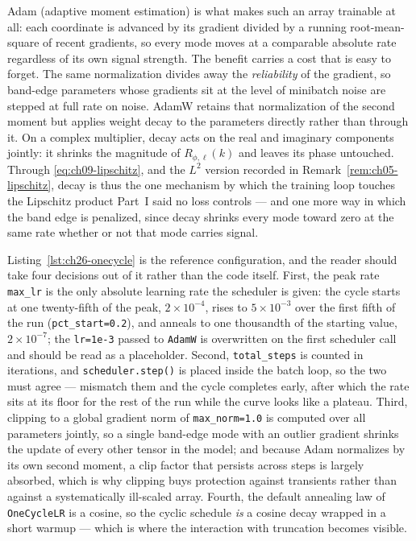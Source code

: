 Adam (adaptive moment estimation) is what makes such an array trainable at all: each
coordinate is advanced by its gradient divided by a running root-mean-square of recent
gradients, so every mode moves at a comparable absolute rate regardless of its own signal
strength. The benefit carries a cost that is easy to forget. The same normalization divides
away the \emph{reliability} of the gradient, so band-edge parameters whose gradients sit at
the level of minibatch noise are stepped at full rate on noise. AdamW retains that
normalization of the second moment but applies weight decay to the parameters directly rather
than through it. On a complex multiplier, decay acts on the real and imaginary components
jointly: it shrinks the magnitude of $R_{\phi,\ell}(k)$ and leaves its phase untouched.
Through
\eqref{eq:ch09-lipschitz}, and the $L^2$ version recorded in Remark~\ref{rem:ch05-lipschitz},
decay is thus the one mechanism by which the training loop touches the Lipschitz product
Part~I said no loss controls --- and one more way in which the band edge is penalized,
since decay shrinks every mode toward zero at the same rate whether or not that mode
carries signal. 

Listing~\ref{lst:ch26-onecycle} is the reference configuration, and the reader should take
four decisions out of it rather than the code itself. First, the peak rate
\texttt{max\_lr} is the only absolute learning rate the scheduler is given: the cycle starts
at one twenty-fifth of the peak, $2\times10^{-4}$, rises to $5\times10^{-3}$ over the first
fifth of the run (\texttt{pct\_start=0.2}), and anneals to one thousandth of the starting
value, $2\times10^{-7}$; the \texttt{lr=1e-3} passed to \texttt{AdamW} is overwritten on
the first scheduler call and should be read as a placeholder. Second, \texttt{total\_steps}
is counted in iterations, and \texttt{scheduler.step()} is placed inside the batch loop, so
the two must agree --- mismatch them and the cycle completes early, after which the rate
sits at its floor for the rest of the run while the curve looks like a plateau. Third,
clipping to a global gradient norm of \texttt{max\_norm=1.0} is computed over all
parameters jointly, so a single band-edge mode with an outlier gradient shrinks the update
of every other tensor in the model; and because Adam normalizes by its own second moment, a
clip factor that persists across steps is largely absorbed, which is why clipping buys
protection against transients rather than against a systematically ill-scaled array.
Fourth, the default annealing law of \texttt{OneCycleLR} is a cosine, so the cyclic schedule
\emph{is} a cosine decay wrapped in a short warmup --- which is where the interaction with
truncation becomes visible. 

